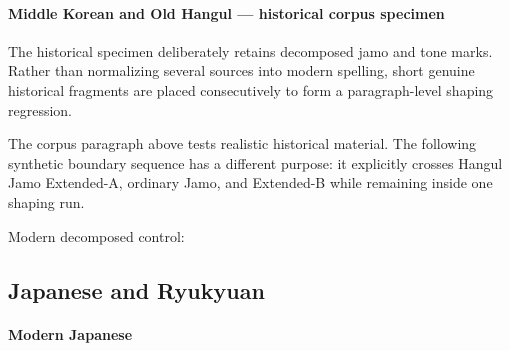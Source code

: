 
\paragraph{Middle Korean and Old Hangul --- historical corpus specimen}

The historical specimen deliberately retains decomposed jamo and tone marks.
Rather than normalizing several sources into modern spelling, short genuine
historical fragments are placed consecutively to form a paragraph-level
shaping regression.


The corpus paragraph above tests realistic historical material. The following
synthetic boundary sequence has a different purpose: it explicitly crosses
Hangul Jamo Extended-A, ordinary Jamo, and Extended-B while remaining inside
one shaping run.

\begin{center}
\Huge
{}
\end{center}

Modern decomposed control:

\begin{center}
\Huge
{}
\end{center}


\subsection{Japanese and Ryukyuan}

\paragraph{Modern Japanese}

